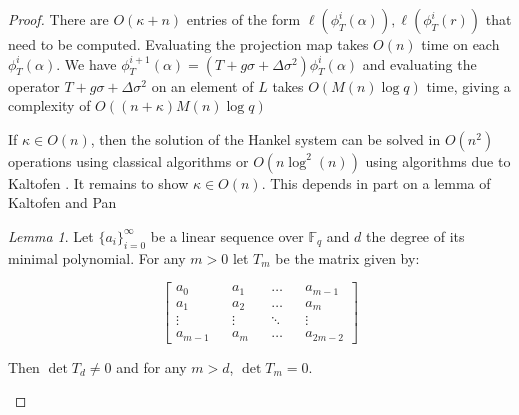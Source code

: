 \documentclass{acmart}
\theoremstyle{remark}
\numberwithin{equation}{section}
\newtheorem{lemma}{Lemma}
\begin{document}
\begin{proof}

There are $O(\kappa + n)$ entries of the form $\ell(\phi_T^i(\alpha)), \ell(\phi_T^i(r))$ that need to be computed. Evaluating the projection map takes $O(n)$ time on each $\phi_T^i(\alpha)$. We have $\phi_T^{i+1}(\alpha) = (T + g\sigma + \Delta \sigma^2)\phi_T^i(\alpha)$ and evaluating the operator $T + g\sigma + \Delta \sigma^2$ on an element of $L$ takes $O(M(n)\log q)$ time, giving a complexity of $O((n + \kappa)M(n)\log q)$

If $\kappa \in O(n)$, then the solution of the Hankel system can be solved in $O(n^2)$ operations using classical algorithms or $O(n \log^2(n))$ using algorithms due to Kaltofen \cite{kaltofen1994}. It remains to show $\kappa \in O(n)$. This depends in part on a lemma of Kaltofen and Pan \cite{Kaltofen:1991:PEP:113379.113396}

\begin{lemma}\label{kalpan}
Let $\{a_i\}_{i=0}^{\infty}$ be a linear sequence over $\mathbb{F}_q$ and $d$ the degree of its minimal polynomial. For any $m > 0$ let $T_m$ be the matrix given by:

\[\begin{bmatrix} a_0 && a_1 && \ldots && a_{m-1} \\ a_1 && a_2 && \ldots && a_{m} \\ \vdots && \vdots && \ddots && \vdots \\ a_{m-1} && a_{m} && \ldots && a_{2m - 2}  \end{bmatrix}\]

\noindent Then $\det T_d \neq 0$ and for any $m > d$, $\det T_m = 0$.
\end{lemma}



\end{proof}
\end{document}
